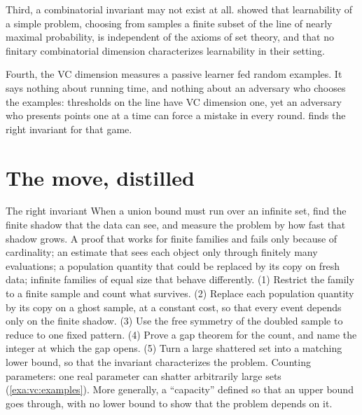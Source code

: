 \begin{refsection}
Third, a combinatorial invariant may not exist at all. \textcite{BenDavidEtAl2019} showed that learnability of a simple problem, choosing from samples a finite subset of the line of nearly maximal probability, is independent of the axioms of set theory, and that no finitary combinatorial dimension characterizes learnability in their setting.

Fourth, the VC dimension measures a passive learner fed random examples. It says nothing about running time, and nothing about an adversary who chooses the examples: thresholds on the line have VC dimension one, yet an adversary who presents points one at a time can force a mistake in every round.  finds the right invariant for that game.

\section{The move, distilled}\label{sec:vc:distilled}

\begin{move}{The right invariant}
 When a union bound must run over an infinite set, find the finite shadow that the data can see, and measure the problem by how fast that shadow grows.
 A proof that works for finite families and fails only because of cardinality; an estimate that sees each object only through finitely many evaluations; a population quantity that could be replaced by its copy on fresh data; infinite families of equal size that behave differently.
 (1) Restrict the family to a finite sample and count what survives. (2) Replace each population quantity by its copy on a ghost sample, at a constant cost, so that every event depends only on the finite shadow. (3) Use the free symmetry of the doubled sample to reduce to one fixed pattern. (4) Prove a gap theorem for the count, and name the integer at which the gap opens. (5) Turn a large shattered set into a matching lower bound, so that the invariant characterizes the problem.
 Counting parameters: one real parameter can shatter arbitrarily large sets (\cref{exa:vc:examples}). More generally, a ``capacity'' defined so that an upper bound goes through, with no lower bound to show that the problem depends on it.
\end{move}



\end{refsection}
